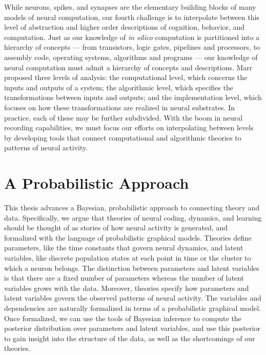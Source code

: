 While neurons, spikes, and synapses are the elementary building blocks
of many models of neural computation, our fourth challenge is to
interpolate between this level of abstraction and higher order
descriptions of cognition, behavior, and computation.  Just as our
knowledge of \emph{in silico} computation is partitioned into a
hierarchy of concepts --- from transistors, logic gates, pipelines and
processors, to assembly code, operating systems, algorithms and
programs --- our knowledge of neural computation must admit a hierarchy
of concepts and descriptions.  Marr proposed three levels of analysis:
the computational level, which concerns the inputs and outputs of a
system; the algorithmic level, which specifies the transformations
between inputs and outputs; and the implementation level, which
focuses on how these transformations are realized in neural
substrates. In practice, each of these may be further subdivided. 
With the boom in neural recording capabilities, we must focus our efforts
on interpolating between levels by developing tools that connect
computational and algorithmic theories to patterns of neural activity.


\section{A Probabilistic Approach} 
This thesis advances a Bayesian, probabilistic approach to connecting
theory and data. Specifically, we argue that theories of neural
coding, dynamics, and learning should be thought of as stories of how
neural activity is generated, and formalized with the language of
probabilistic graphical models.  Theories define parameters, like the
time constants that govern neural dynamics, and latent variables, like
discrete population states at each point in time or the cluster to
which a neuron belongs. The distinction between parameters and latent
variables is that there are a fixed number of parameters whereas the
number of latent variables grows with the data.  Moreover, theories
specify how parameters and latent variables govern the
observed patterns of neural activity.  The variables and dependencies
are naturally formalized in terms of a probabilistic graphical model.
Once formalized, we can use the tools of Bayesian inference to compute
the posterior distribution over parameters and latent variables, and
use this posterior to gain insight into the structure of the data, as
well as the shortcomings of our theories.

